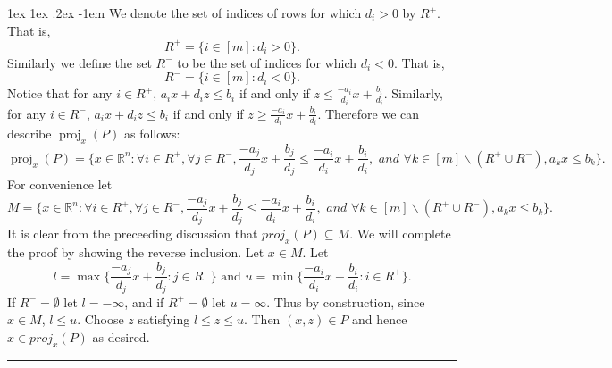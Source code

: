 \documentclass[11pt]{article}
\makeatletter
\renewcommand\paragraph{\@startsection{paragraph}{4}{0mm}%
                                    {1ex \@plus1ex \@minus.2ex}%
                                    {-1em}%
                                    {\normalfont\normalsize\bfseries}}
\newenvironment{proof}{{\bf Proof:  }}{\hfill\rule{2mm}{2mm}}
\newcommand{\R}{\ensuremath{\mathbb R}}
\DeclareMathOperator{\proj}{proj}
\makeatother
\begin{document}
\paragraph{}
We denote the set of indices of rows for which $d_i >0$ by $R^+$. That is,
$$R^+ = \{ i \in [m] : d_i > 0 \}.$$
Similarly we define the set $R^-$ to be the set of indices for which $d_i < 0$. That is,
$$R^- = \{ i \in [m] : d_i < 0 \}.$$
Notice that for any $i \in R^+$, $a_i x + d_i z \leq b_i$ if and only if $z \leq \frac{-a_i}{d_i}x + \frac{b_i}{d_i}$.
Similarly, for any $i \in R^-$, $a_i x + d_i z \leq b_i$ if and only if $z \geq \frac{-a_i}{d_i}x + \frac{b_i}{d_i}$.
Therefore we can describe $\proj_x(P)$ as follows:
$$\proj_x(P) = \{x \in \R^n : \forall i \in R^+, \forall j \in R^-, \frac{-a_j}{d_j}x + \frac{b_j}{d_j} \leq \frac{-a_i}{d_i}x + \frac{b_i}{d_i}, \textit{ and } \forall k \in [m] \backslash (R^+ \cup R^-), a_k x \leq b_k \}.$$
\begin{proof}
For convenience let $$M = \{x \in \R^n : \forall i \in R^+, \forall j \in R^-, \frac{-a_j}{d_j}x + \frac{b_j}{d_j} \leq \frac{-a_i}{d_i}x + \frac{b_i}{d_i}, \textit{ and } \forall k \in [m] \backslash (R^+ \cup R^-), a_k x \leq b_k \}.$$
It is clear from the preceeding discussion that $proj_x(P) \subseteq M$. We will complete the proof by showing the reverse inclusion. Let $x \in M$. Let
$$l = \max\{\frac{-a_j}{d_j}x + \frac{b_j}{d_j} : j \in R^-\} \text{ and } u = \min\{\frac{-a_i}{d_i}x + \frac{b_i}{d_i}: i \in R^+\}.$$
If $R^- = \emptyset$ let $l = -\infty$, and if $R^+ = \emptyset$ let $u = \infty$. Thus by construction, since $x \in M$, $l \leq u$. Choose $z$ satisfying $l \leq z \leq u$. Then $(x,z) \in P$ and hence $ x \in proj_x(P)$ as desired.
\end{proof}
\end{document}
